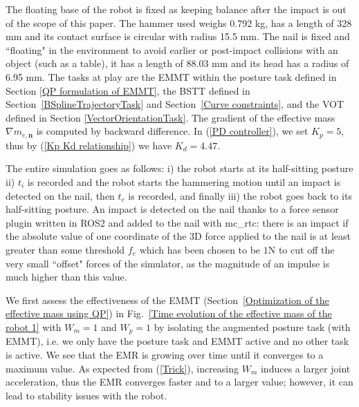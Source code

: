 \documentclass[conference]{IEEEtran}
\begin{document}
The floating base of the robot is fixed as keeping balance after the impact is out of the scope of this paper. 
The hammer used weighs 0.792 kg, has a length of 328 mm and its contact surface is circular with radius 15.5 mm. 
The nail is fixed and ``floating" in the environment to avoid earlier or post-impact collisions with an object (such as a table), it has a length of 88.03 mm and its head has a radius of 6.95 mm. 
The tasks at play are the EMMT within the posture task defined in Section \ref{QP formulation of EMMT}, the BSTT defined in Section~\ref{BSplineTrajectoryTask} and Section~\ref{Curve constraints}, and the VOT defined in Section \ref{VectorOrientationTask}. The gradient of the effective mass $\nabla m_{e, \mathbf{n}}$ is computed by backward difference. In (\ref{PD controller}), we set $K_p = 5$, thus by (\ref{Kp Kd relationship}) we have $K_d = 4.47$. 

The entire simulation goes as follows: i) the robot starts at its half-sitting posture ii) $t_i$ is recorded and the robot starts the hammering motion until an impact is detected on the nail, then $t_c$ is recorded, and finally iii) the robot goes back to its half-sitting posture. An impact is detected on the nail thanks to a force sensor plugin written in ROS2 and added to the nail with mc\_rtc: there is an impact if the absolute value of one coordinate of the 3D force applied to the nail is at least greater than some threshold $f_{e}$ which has been chosen to be $1$N to cut off the very small ``offset" forces of the simulator, as the magnitude of an impulse is much higher than this value. 

We first assess the effectiveness of the EMMT (Section~\ref{Optimization of the effective mass using QP}) in Fig.~\ref{Time evolution of the effective mass of the robot 1} with $W_m = 1$ and $W_p  = 1$ 
by isolating the augmented posture task (with EMMT), i.e. we only have the posture task and EMMT active and no other task is active. 
We see that the EMR is growing over time until it converges to a maximum value. As expected from (\ref{Trick}), increasing $W_m$ induces a larger joint acceleration, thus the EMR converges faster and to a larger value; however, it can lead to stability issues with the robot. 
\end{document}
